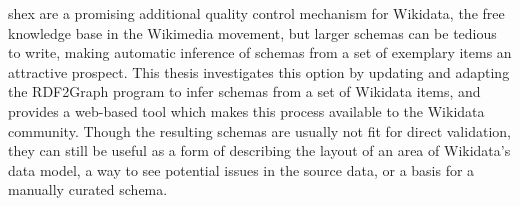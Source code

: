 
\Abstract
\acrlong{shex} are a promising additional quality control mechanism for \gls{Wikidata},
the free knowledge base in the \gls{Wikimedia} movement,
but larger \glspl{schema} can be tedious to write,
making automatic inference of \glspl{schema} from a set of exemplary \glspl{item} an attractive prospect. %
This thesis investigates %
this option by updating and adapting the RDF2Graph program to infer \glspl{schema} from a set of \gls{Wikidata} \glspl{item},
and provides a web-based tool which makes this process available to the \gls{Wikidata} community.
Though the resulting \glspl{schema} are usually not fit for direct validation,
they can still be useful as a form of describing the layout of an area of \gls{Wikidata}’s data model,
a way to see potential issues in the source data, %
or a basis for a manually curated \gls{schema}.
